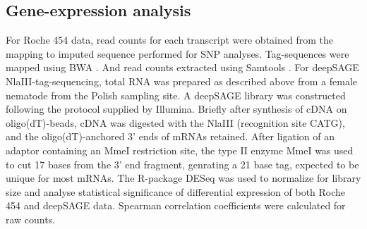 \subsection*{Gene-expression analysis}

For Roche 454 data, read counts for each transcript were obtained from
the mapping to imputed sequence performed for SNP
analyses. Tag-sequences were mapped using BWA \cite{pmid19451168}. And
read counts extracted using Samtools
\cite{journals/bioinformatics/LiHWFRHMAD09}. For deepSAGE
NlaIII-tag-sequencing, total RNA was prepared as described above from
a female nematode from the Polish sampling site. A deepSAGE library
was constructed following the protocol supplied by Illumina. Briefly
after synthesis of cDNA on oligo(dT)-beads, cDNA was digested with the
NlaIII (recognition site CATG), and the oligo(dT)-anchored 3' ends of
mRNAs retained. After ligation of an adaptor containing an MmeI
restriction site, the type II enzyme MmeI was used to cut 17 bases
from the 3' end fragment, genrating a 21 base tag, expected to be
unique for most mRNAs. The R-package DESeq \cite{pmid20979621} was
used to normalize for library size and analyse statistical
significance of differential expression of both Roche 454 and deepSAGE
data. Spearman correlation coefficients were calculated for raw
counts.


 






